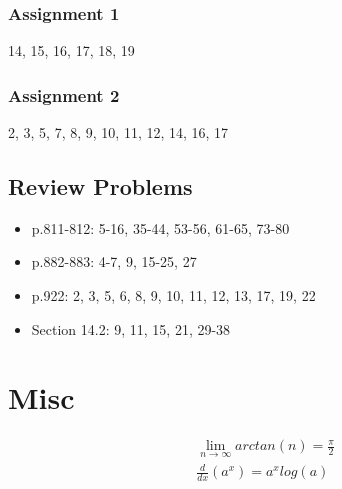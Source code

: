 \documentclass[12 pt]{article}
\theoremstyle{definition}
\begin{document}
\subsubsection{Assignment 1} 14, 15, 16, 17, 18, 19
\subsubsection{Assignment 2} 2, 3, 5, 7, 8, 9, 10, 11, 12, 14, 16, 17
\subsection{Review Problems}
\begin{itemize}
	\item p.811-812: 5-16, 35-44, 53-56, 61-65, 73-80
	\item p.882-883: 4-7, 9, 15-25, 27
	\item p.922: 2, 3, 5, 6, 8, 9, 10, 11, 12, 13, 17, 19, 22
	\item Section 14.2: 9, 11, 15, 21, 29-38
\end{itemize}
\section{Misc}
\begin{align}
	& \lim_{n\to \infty}arctan(n)=\frac{\pi}{2}
	\\&\frac{d}{dx}\left(a^x\right)=a^x log(a)
\end{align}
\end{document}
